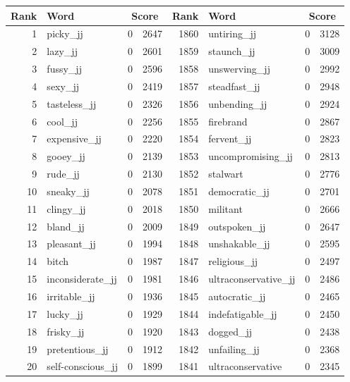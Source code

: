 \begin{table}[tbp]
    \begin{tabular}{| rlr@{.}l | rlr@{.}l |}
    \hline
    \textbf{Rank} & \textbf{Word} & \multicolumn{2}{c|}{\textbf{Score}} & \textbf{Rank} & \textbf{Word} & \multicolumn{2}{c|}{\textbf{Score}} \\
    \hline
    1 & picky\_jj & 0 & 2647    &    1860 & untiring\_jj & 0 & 3128 \\
    2 & lazy\_jj & 0 & 2601    &    1859 & staunch\_jj & 0 & 3009 \\
    3 & fussy\_jj & 0 & 2596    &    1858 & unswerving\_jj & 0 & 2992 \\
    4 & sexy\_jj & 0 & 2419    &    1857 & steadfast\_jj & 0 & 2948 \\
    5 & tasteless\_jj & 0 & 2326    &    1856 & unbending\_jj & 0 & 2924 \\
    6 & cool\_jj & 0 & 2256    &    1855 & firebrand & 0 & 2867 \\
    7 & expensive\_jj & 0 & 2220    &    1854 & fervent\_jj & 0 & 2823 \\
    8 & gooey\_jj & 0 & 2139    &    1853 & uncompromising\_jj & 0 & 2813 \\
    9 & rude\_jj & 0 & 2130    &    1852 & stalwart & 0 & 2776 \\
    10 & sneaky\_jj & 0 & 2078    &    1851 & democratic\_jj & 0 & 2701 \\
    11 & clingy\_jj & 0 & 2018    &    1850 & militant & 0 & 2666 \\
    12 & bland\_jj & 0 & 2009    &    1849 & outspoken\_jj & 0 & 2647 \\
    13 & pleasant\_jj & 0 & 1994    &    1848 & unshakable\_jj & 0 & 2595 \\
    14 & bitch & 0 & 1987    &    1847 & religious\_jj & 0 & 2497 \\
    15 & inconsiderate\_jj & 0 & 1981    &    1846 & ultraconservative\_jj & 0 & 2486 \\
    16 & irritable\_jj & 0 & 1936    &    1845 & autocratic\_jj & 0 & 2465 \\
    17 & lucky\_jj & 0 & 1929    &    1844 & indefatigable\_jj & 0 & 2450 \\
    18 & frisky\_jj & 0 & 1920    &    1843 & dogged\_jj & 0 & 2438 \\
    19 & pretentious\_jj & 0 & 1912    &    1842 & unfailing\_jj & 0 & 2368 \\
    20 & self-conscious\_jj & 0 & 1899    &    1841 & ultraconservative & 0 & 2345 \\

\end{tabular}
\end{table}
